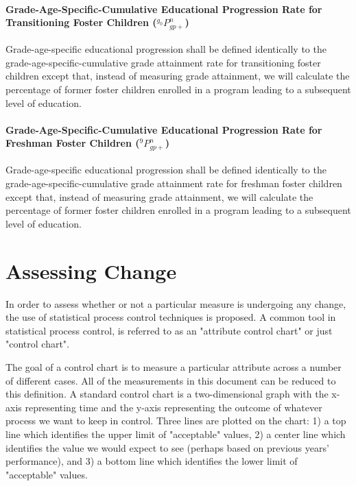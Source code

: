 \documentclass[12pt]{article}\usepackage[]{graphicx}\usepackage[]{color}
\begin{document}
\paragraph{Grade-Age-Specific-Cumulative Educational Progression Rate for Transitioning Foster Children (${}^{g_{0}}P_{gp+}^n$)}

Grade-age-specific educational progression shall be defined identically to the grade-age-specific-cumulative grade attainment rate for transitioning foster children except that, instead of measuring grade attainment, we will calculate the percentage of former foster children enrolled in a program leading to a subsequent level of education. 

\paragraph{Grade-Age-Specific-Cumulative Educational Progression Rate for Freshman Foster Children (${}^{9}P_{gp+}^n$)}

Grade-age-specific educational progression shall be defined identically to the grade-age-specific-cumulative grade attainment rate for freshman foster children except that, instead of measuring grade attainment, we will calculate the percentage of former foster children enrolled in a program leading to a subsequent level of education. 

\section{Assessing Change}

In order to assess whether or not a particular measure is undergoing any change, the use of statistical process control techniques is proposed. A common tool in statistical process control, is referred to as an "attribute control chart" or just "control chart". 

The goal of a control chart is to measure a particular attribute across a number of different cases. All of the measurements in this document can be reduced to this definition. A standard control chart is a two-dimensional graph with the x-axis representing time and the y-axis representing the outcome of whatever process we want to keep in control. Three lines are plotted on the chart: 1) a top line which identifies the upper limit of "acceptable" values, 2) a center line which identifies the value we would expect to see (perhaps based on previous years' performance), and 3) a bottom line which identifies the lower limit of "acceptable" values. 
\end{document}
